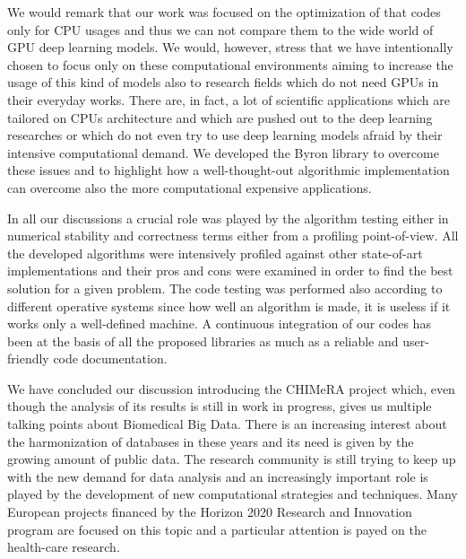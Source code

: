 \documentclass{standalone}
\begin{document}
We would remark that our work was focused on the optimization of that codes only for CPU usages and thus we can not compare them to the wide world of GPU deep learning models.
We would, however, stress that we have intentionally chosen to focus only on these computational environments aiming to increase the usage of this kind of models also to research fields which do not need GPUs in their everyday works.
There are, in fact, a lot of scientific applications which are tailored on CPUs architecture and which are pushed out to the deep learning researches or which do not even try to use deep learning models afraid by their intensive computational demand.
We developed the \textsf{Byron} library to overcome these issues and to highlight how a well-thought-out algorithmic implementation can overcome also the more computational expensive applications.

In all our discussions a crucial role was played by the algorithm testing either in numerical stability and correctness terms either from a profiling point-of-view.
All the developed algorithms were intensively profiled against other state-of-art implementations and their pros and cons were examined in order to find the best solution for a given problem.
The code testing was performed also according to different operative systems since how well an algorithm is made, it is useless if it works only a well-defined machine.
A continuous integration of our codes has been at the basis of all the proposed libraries as much as a reliable and user-friendly code documentation.

We have concluded our discussion introducing the \textsf{CHIMeRA} project which, even though the analysis of its results is still in work in progress, gives us multiple talking points about Biomedical Big Data.
There is an increasing interest about the harmonization of databases in these years and its need is given by the growing amount of public data.
The research community is still trying to keep up with the new demand for data analysis and an increasingly important role is played by the development of new computational strategies and techniques.
Many European projects financed by the Horizon 2020 Research and Innovation program are focused on this topic and a particular attention is payed on the health-care research.
\end{document}
